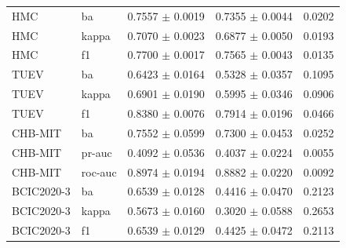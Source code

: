 \begin{table}[tbp]
\begin{tabular}{@{}l l c c c@{}}
HMC & ba & 0.7557 $\pm$ 0.0019 & 0.7355 $\pm$ 0.0044 & 0.0202 \\
HMC & kappa & 0.7070 $\pm$ 0.0023 & 0.6877 $\pm$ 0.0050 & 0.0193 \\
HMC & f1 & 0.7700 $\pm$ 0.0017 & 0.7565 $\pm$ 0.0043 & 0.0135 \\
TUEV & ba & 0.6423 $\pm$ 0.0164 & 0.5328 $\pm$ 0.0357 & 0.1095 \\
TUEV & kappa & 0.6901 $\pm$ 0.0190 & 0.5995 $\pm$ 0.0346 & 0.0906 \\
TUEV & f1 & 0.8380 $\pm$ 0.0076 & 0.7914 $\pm$ 0.0196 & 0.0466 \\
CHB-MIT & ba & 0.7552 $\pm$ 0.0599 & 0.7300 $\pm$ 0.0453 & 0.0252 \\
CHB-MIT & pr-auc & 0.4092 $\pm$ 0.0536 & 0.4037 $\pm$ 0.0224 & 0.0055 \\
CHB-MIT & roc-auc & 0.8974 $\pm$ 0.0194 & 0.8882 $\pm$ 0.0220 & 0.0092 \\
BCIC2020-3 & ba & 0.6539 $\pm$ 0.0128 & 0.4416 $\pm$ 0.0470 & 0.2123 \\
BCIC2020-3 & kappa & 0.5673 $\pm$ 0.0160 & 0.3020 $\pm$ 0.0588 & 0.2653 \\
BCIC2020-3 & f1 & 0.6539 $\pm$ 0.0129 & 0.4425 $\pm$ 0.0472 & 0.2113 \\
\bottomrule\end{tabular}\end{table}

